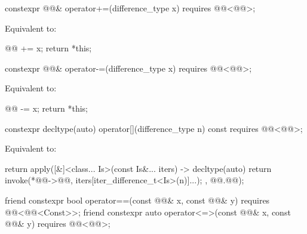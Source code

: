 %
\begin{itemdecl}
constexpr @@& operator+=(difference_type x)
  requires @@<@@>;
\end{itemdecl}

\begin{itemdescr}
\pnum
\effects
Equivalent to:
\begin{codeblock}
@@ += x;
return *this;
\end{codeblock}
\end{itemdescr}

%
\begin{itemdecl}
constexpr @@& operator-=(difference_type x)
  requires @@<@@>;
\end{itemdecl}

\begin{itemdescr}
\pnum
\effects
Equivalent to:
\begin{codeblock}
@@ -= x;
return *this;
\end{codeblock}
\end{itemdescr}

%
\begin{itemdecl}
constexpr decltype(auto) operator[](difference_type n) const
  requires @@<@@>;
\end{itemdecl}

\begin{itemdescr}
\pnum
\effects
Equivalent to:
\begin{codeblock}
return apply([&]<class... Is>(const Is&... iters) -> decltype(auto) {
  return invoke(*@@->@@, iters[iter_difference_t<Is>(n)]...);
}, @@.@@);
\end{codeblock}
\end{itemdescr}

%
\begin{itemdecl}
friend constexpr bool operator==(const @@& x, const @@& y)
  requires @@<@@<Const>>;
friend constexpr auto operator<=>(const @@& x, const @@& y)
  requires @@<@@>;
\end{itemdecl}

